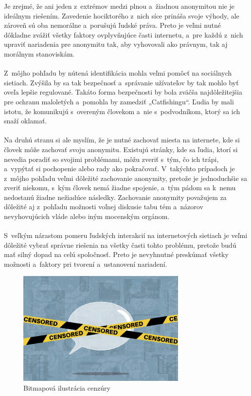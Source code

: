\documentclass{artikel1}
\begin{document}
Je zrejmé, že ani jeden z~extrémov  medzi plnou a~žiadnou anonymitou nie je ideálnym riešením. Zavedenie hociktorého z~nich síce prináša svoje výhody, ale zároveň sú oba nemorálne a~porušujú ľudské práva. Preto je veľmi nutné dôkladne zvážiť všetky faktory ovplyvňujúce časti internetu, a~pre každú z~nich upraviť nariadenia pre anonymitu tak, aby vyhovovali ako právnym, tak aj morálnym stanoviskám.\\\\
Z~môjho pohľadu by nútená identifikácia mohla veľmi pomôcť na sociálnych sietiach. Zvýšila by sa tak bezpečnosť a~správanie užívateľov by tak mohlo byť oveľa lepšie regulované. Takáto forma bezpečnosti by bola zväčša najdôležitejšia pre ochranu maloletých a~pomohla by zamedziť „Catfishingu“. Ľudia by mali istotu, že komunikujú s~overeným človekom  a~nie s~podvodníkom,  ktorý sa ich snaží oklamať.\\\\
Na druhú stranu si ale myslím, že je nutné zachovať miesta na internete, kde si človek môže zachovať svoju anonymitu. Existujú stránky, kde sa ľudia, ktorí si nevedia poradiť so svojimi problémami, môžu zveriť s~tým, čo ich trápi, a~vypýtať si pochopenie alebo rady ako pokračovať. V~takýchto prípadoch je z~môjho pohľadu veľmi dôležité zachovanie anonymity, pretože je jednoduchšie sa zveriť niekomu, s~kým človek nemá žiadne spojenie, a~tým pádom sa k~nemu nedostanú žiadne nežiadúce následky. Zachovanie anonymity považujem za dôležité aj z~pohľadu možnosti voľnej diskusie tabu tém a~názorov nevyhovujúcich vláde alebo iným mocenským orgánom.\\\\
S~veľkým nárastom pomeru ľudských interakcií na internetových  sietiach je veľmi dôležité vybrať správne riešenia na všetky časti tohto problému, pretože budú mať silný dopad na celú spoločnosť. Preto je nevyhnutné preskúmať všetky možnosti a~faktory pri tvorení a~ustanovení nariadení.

\begin{figure}[htbp]
    \begin{center}
        \includegraphics[width=0.75\textwidth]{censor}
    \end{center}
    \caption{Bitmapová ilustrácia cenzúry}
    \label{censor}
\end{figure}
\end{document}
